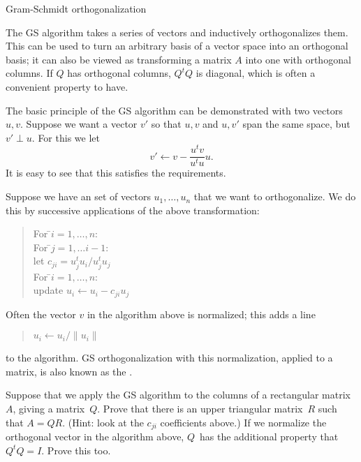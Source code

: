 
 {Gram-Schmidt orthogonalization}
\label{app:gram-schmidt}

The \acf{GS} algorithm takes a series of vectors and inductively
orthogonalizes them. This can be used to turn an arbitrary basis of a
vector space into an orthogonal basis; it can also be viewed as
transforming a matrix $A$ into one with orthogonal columns. If $Q$ has
orthogonal columns, $Q^tQ$ is diagonal, which is often a convenient
property to have.

The basic principle of the \ac{GS} algorithm
can be demonstrated with two
vectors~$u,v$. Suppose we want a vector $v'$ so that $u,v$ and $u,v'$
span the same space, but $v'\perp u$. For this we let
\[ v'\leftarrow v-\frac{u^tv}{u^tu}u. \]
It is easy to see that this satisfies the requirements.

Suppose we have an set of vectors
$u_1,\ldots,u_n$ that we want to orthogonalize. We do this by
successive applications of the above transformation:

\begin{quote}
  \begin{tabbing}
    For \=$i=1,\ldots,n$:\\
    \> For \=$j=1,\ldots i-1$:\\
    \>\>let $c_{ji}=u_j^tu_i/u_j^tu_j$\\
    \> For \=$i=1,\ldots,n$:\\
    \>\> update $u_i\leftarrow u_i-c_{ji}u_j$
  \end{tabbing}
\end{quote}

Often the vector $v$ in the algorithm above is normalized; this adds a line
\begin{quote}
  \begin{tabbing}
    $u_i\leftarrow u_i/\|u_i\|$
  \end{tabbing}
\end{quote}
to the algorithm.
\ac{GS} orthogonalization with this normalization, applied to a
matrix, is also known as the .

\begin{exercise}
  Suppose that we apply the \ac{GS} algorithm to the columns of a
  rectangular matrix~$A$, giving a matrix~$Q$. Prove that there is an
  upper triangular matrix~$R$ such that $A=QR$. (Hint: look at the
  $c_{ji}$ coefficients above.) If we normalize the
  orthogonal vector in the algorithm above, $Q$~has the additional property
  that $Q^tQ=I$. Prove this too.
\end{exercise}

